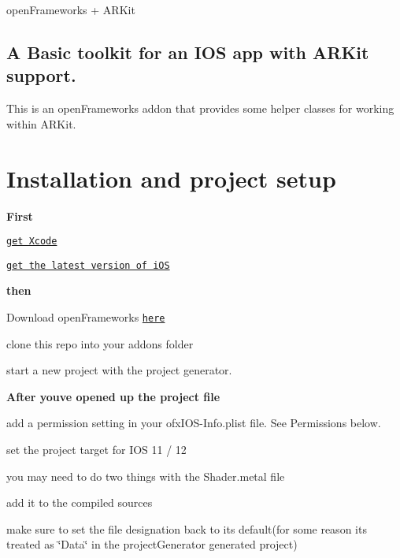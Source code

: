 open\+Frameworks + A\+R\+Kit

\subsection*{A Basic toolkit for an I\+OS app with A\+R\+Kit support.}

This is an open\+Frameworks addon that provides some helper classes for working within A\+R\+Kit.

\section*{Installation and project setup}

{\bfseries First}
\begin{DoxyItemize}
\item \href{https://developer.apple.com/xcode/}{\tt get Xcode}
\item \href{https://www.apple.com/ios}{\tt get the latest version of i\+OS}
\end{DoxyItemize}

{\bfseries then}
\begin{DoxyItemize}
\item Download open\+Frameworks \href{https://openframeworks.cc/versions/v0.10.0/of_v0.10.0_ios_release.zip}{\tt here}
\item clone this repo into your addons folder
\item start a new project with the project generator.
\end{DoxyItemize}

{\bfseries After you\textquotesingle{}ve opened up the project file}
\begin{DoxyItemize}
\item add a permission setting in your {\ttfamily ofx\+I\+O\+S-\/\+Info.\+plist} file. See Permissions below.
\item set the project target for I\+OS 11 / 12
\item you may need to do two things with the {\ttfamily Shader.\+metal} file
\begin{DoxyItemize}
\item add it to the compiled sources
\item make sure to set the file designation back to it\textquotesingle{}s default(for some reason it\textquotesingle{}s treated as \char`\"{}\+Data\char`\"{} in the project\+Generator generated project)
\end{DoxyItemize}
\end{DoxyItemize}

